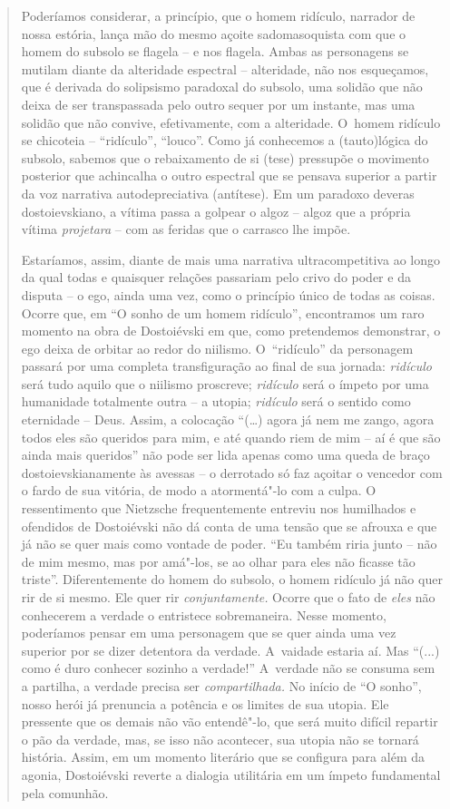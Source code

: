 {\begin{quote}
Poderíamos considerar, a princípio, que o homem ridículo, narrador de
nossa estória, lança mão do mesmo açoite sadomasoquista com que o homem
do subsolo se flagela -- e nos flagela. Ambas as personagens se mutilam
diante da alteridade espectral -- alteridade, não nos esqueçamos, que é
derivada do solipsismo paradoxal do subsolo, uma solidão que não deixa
de ser transpassada pelo outro sequer por um instante, mas uma solidão
que não convive, efetivamente, com a alteridade. O~homem ridículo se
chicoteia -- ``ridículo'', ``louco''. Como já conhecemos a (tauto)lógica
do subsolo, sabemos que o rebaixamento de si (tese) pressupõe o
movimento posterior que achincalha o outro espectral que se pensava
superior a partir da voz narrativa autodepreciativa (antítese). Em um
paradoxo deveras dostoievskiano, a vítima passa a golpear o algoz --
algoz que a própria vítima \emph{projetara} -- com as feridas que o
carrasco lhe impõe.

Estaríamos, assim, diante de mais uma narrativa ultracompetitiva ao
longo da qual todas e quaisquer relações passariam pelo crivo do poder e
da disputa -- o ego, ainda uma vez, como o princípio único de todas as
coisas. Ocorre que, em ``O sonho de um homem ridículo'', encontramos um
raro momento na obra de Dostoiévski em que, como pretendemos demonstrar,
o ego deixa de orbitar ao redor do niilismo. O~``ridículo'' da
personagem passará por uma completa transfiguração ao final de sua
jornada: \emph{ridículo} será tudo aquilo que o niilismo proscreve;
\emph{ridículo} será o ímpeto por uma humanidade totalmente outra -- a
utopia; \emph{ridículo} será o sentido como eternidade -- Deus. Assim, a
colocação ``(\ldots{}) agora já nem me zango, agora todos eles são
queridos para mim, e até quando riem de mim -- aí é que são ainda mais
queridos'' não pode ser lida apenas como uma queda de braço
dostoievskianamente às avessas -- o derrotado só faz açoitar o vencedor
com o fardo de sua vitória, de modo a atormentá"-lo com a culpa. O
ressentimento que Nietzsche frequentemente entreviu nos humilhados e
ofendidos de Dostoiévski não dá conta de uma tensão que se afrouxa e que
já não se quer mais como vontade de poder. ``Eu também riria junto --
não de mim mesmo, mas por amá"-los, se ao olhar para eles não ficasse tão
triste''. Diferentemente do homem do subsolo, o homem ridículo já não
quer rir de si mesmo. Ele quer rir \emph{conjuntamente.} Ocorre que o
fato de \emph{eles} não conhecerem a verdade o entristece sobremaneira.
Nesse momento, poderíamos pensar em uma personagem que se quer ainda uma
vez superior por se dizer detentora da verdade. A~vaidade estaria aí.
Mas ``(...) como é duro conhecer sozinho a verdade!'' A~verdade não se
consuma sem a partilha, a verdade precisa ser \emph{compartilhada.} No
início de ``O sonho'', nosso herói já prenuncia a potência e os limites
de sua utopia. Ele pressente que os demais não vão entendê"-lo, que será
muito difícil repartir o pão da verdade, mas, se isso não acontecer, sua
utopia não se tornará história. Assim, em um momento literário que se
configura para além da agonia, Dostoiévski reverte a dialogia utilitária
em um ímpeto fundamental pela comunhão.


\end{quote}}
